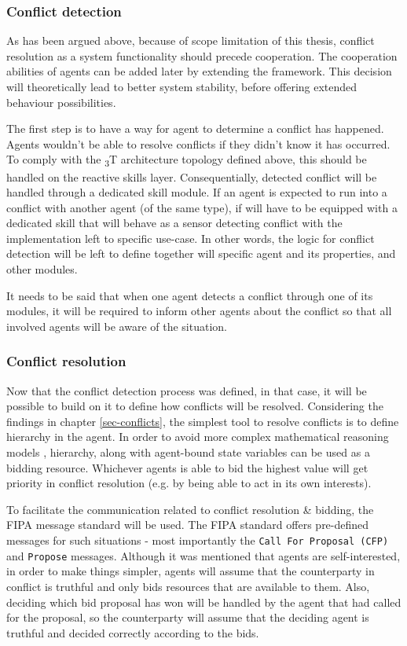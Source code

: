 \documentclass[main.tex]{subfiles}
\begin{document}
\subsubsection{Conflict detection}

As has been argued above, because of scope limitation of this thesis, 
conflict resolution as a system functionality should precede cooperation. The cooperation 
abilities of agents can be added later by extending the framework.
This decision will theoretically lead to better system stability, before offering extended
behaviour possibilities. 

The first step is to have a way for agent to determine a conflict has happened. Agents wouldn't be 
able to resolve conflicts if they didn't know it has occurred. To comply with the \textsubscript{3}T
architecture topology defined above, this should be handled on the reactive skills layer. 
Consequentially, detected conflict will be handled through a dedicated skill module. If an
agent is expected to run into a conflict with another agent (of the same 
 type), if will have
to be equipped with a dedicated skill that will behave as a sensor detecting conflict 
with the implementation left to specific use-case. In other words, the logic for conflict detection will be 
left to define together will specific agent and its properties, and other modules.

It needs to be said that when one agent detects a conflict through one of its modules, it will 
be required to inform other agents about the conflict so that all involved agents will be
aware of the situation. 


\subsubsection{Conflict resolution}

Now that the conflict detection process was defined, in that case, it will be possible to build
on it to define how conflicts will be resolved. Considering the findings in chapter
\ref{sec-conflicts}, the simplest tool to resolve conflicts is to define hierarchy in the
agent. In order to avoid more complex mathematical reasoning models \cite{Binder2022},
hierarchy, along with agent-bound state variables can be used as a bidding resource. Whichever
agents is able to bid the highest value will get priority in conflict resolution (e.g. by being
able to act in its own interests).

To facilitate the communication related to conflict resolution \& bidding, the FIPA message
standard will be used.  The FIPA standard offers pre-defined messages for such situations -
most importantly the \texttt{Call For Proposal (CFP)} and \texttt{Propose} messages. Although
it was mentioned that agents are self-interested, in order to make things simpler, agents will
assume that the counterparty in conflict is truthful and only bids resources that are
available to them. Also, deciding which bid proposal has won will be handled by the agent that
had called for the proposal, so the counterparty will assume that the deciding agent is
truthful and decided correctly according to the bids. 
\end{document}
